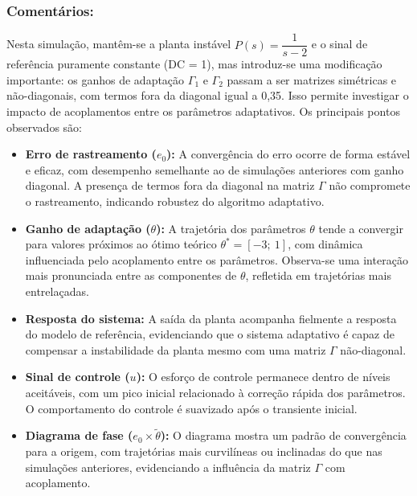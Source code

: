 \documentclass[10pt]{article}
\begin{document}
\subsubsection{Comentários:}

Nesta simulação, mantêm-se a planta instável $P(s) = \dfrac{1}{s - 2}$ e o sinal de referência puramente constante (DC = 1), mas introduz-se uma modificação importante: os ganhos de adaptação $\Gamma_1$ e $\Gamma_2$ passam a ser matrizes simétricas e não-diagonais, com termos fora da diagonal igual a 0{,}35. Isso permite investigar o impacto de acoplamentos entre os parâmetros adaptativos. Os principais pontos observados são:

\begin{itemize}
    \item \textbf{Erro de rastreamento ($e_0$):} A convergência do erro ocorre de forma estável e eficaz, com desempenho semelhante ao de simulações anteriores com ganho diagonal. A presença de termos fora da diagonal na matriz $\Gamma$ não compromete o rastreamento, indicando robustez do algoritmo adaptativo.

    \item \textbf{Ganho de adaptação ($\theta$):} A trajetória dos parâmetros $\theta$ tende a convergir para valores próximos ao ótimo teórico $\theta^* = [-3;\ 1]$, com dinâmica influenciada pelo acoplamento entre os parâmetros. Observa-se uma interação mais pronunciada entre as componentes de $\theta$, refletida em trajetórias mais entrelaçadas.

    \item \textbf{Resposta do sistema:} A saída da planta acompanha fielmente a resposta do modelo de referência, evidenciando que o sistema adaptativo é capaz de compensar a instabilidade da planta mesmo com uma matriz $\Gamma$ não-diagonal.

    \item \textbf{Sinal de controle ($u$):} O esforço de controle permanece dentro de níveis aceitáveis, com um pico inicial relacionado à correção rápida dos parâmetros. O comportamento do controle é suavizado após o transiente inicial.

    \item \textbf{Diagrama de fase ($e_0 \times \tilde{\theta}$):} O diagrama mostra um padrão de convergência para a origem, com trajetórias mais curvilíneas ou inclinadas do que nas simulações anteriores, evidenciando a influência da matriz $\Gamma$ com acoplamento.

\end{itemize}
\end{document}
